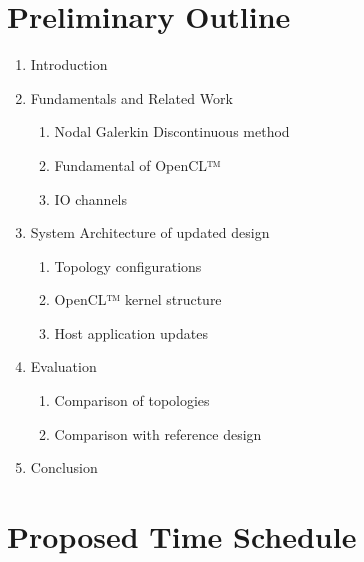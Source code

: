 \documentclass[english,notitlepage]{hgbreport}
\begin{document}
\section{Preliminary Outline}
\begin{enumerate}
	\item Introduction
	\item Fundamentals and Related Work
	\begin{enumerate}
		\item Nodal Galerkin Discontinuous method
		\item Fundamental of OpenCL™
		\item IO channels
	\end{enumerate}
	\item System Architecture of updated design
	\begin{enumerate}
		\item Topology configurations
		\item OpenCL™ kernel structure
		\item Host application updates
	\end{enumerate}
	\item Evaluation
	\begin{enumerate}
		\item Comparison of topologies
		\item Comparison with reference design
	\end{enumerate}
	\item Conclusion

\end{enumerate}

\section{Proposed Time Schedule}
\end{document}
